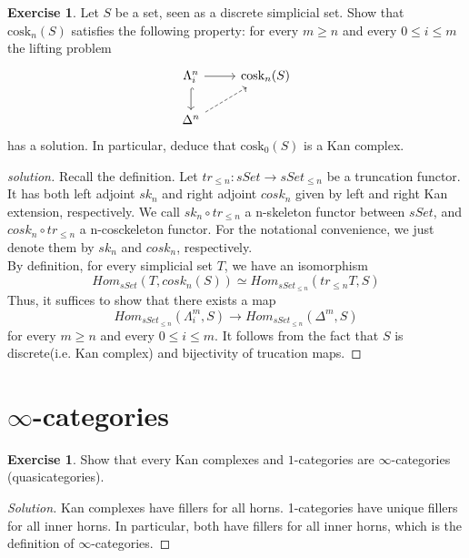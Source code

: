 \documentclass[10pt,a4paper,reqno,oneside]{book} %
\theoremstyle{plain}
\theoremstyle{definition}
\newtheorem{exercise}[thm]{Exercise}
\theoremstyle{remark}
\numberwithin{equation}{section}
\begin{document}
\begin{exercise} \label{ex:coskeleton_Kan_complex}
	Let $S$ be a set, seen as a discrete simplicial set.
	Show that $\mathrm{cosk}_n(S)$ satisfies the following property: for every $m \ge n$ and every $0 \le i \le m$ the lifting problem
	\[ \begin{tikzcd}
		\Lambda^n_i \arrow{r} \arrow[hook]{d} & \mathrm{cosk}_n(S) \\
		\Delta^n \arrow[dashed]{ur}
	\end{tikzcd} \]
	has a solution.
	In particular, deduce that $\mathrm{cosk}_0(S)$ is a Kan complex.
\end{exercise}

\ifpersonal
\begin{proof}[solution]
    Recall the definition. Let $tr_{\leq n}:sSet \to sSet_{\leq n}$ be a truncation functor. It has both left adjoint $sk_n$ and right adjoint $cosk_n$ given by left and right Kan extension, respectively. We call $sk_n \circ tr_{\leq n}$ a n-skeleton functor between $sSet$, and $cosk_n \circ tr_{\leq n}$ a n-cosckeleton functor. For the notational convenience, we just denote them by $sk_n$ and $cosk_n$, respectively. \\
    By definition, for every simplicial set $T$, we have an isomorphism 
    \[Hom_{sSet}(T, cosk_n(S)) \simeq Hom_{sSet_{\leq n}}(tr_{\leq n}T, S)\]
    Thus, it suffices to show that there exists a map 
    \[Hom_{sSet_{\leq n}}(\Lambda^m_i, S) \to Hom_{sSet_{\leq n}}(\Delta^m, S)\]
    for every $m \geq n$ and every $0 \leq i \leq m$. It follows from the fact that $S$ is discrete(i.e. Kan complex) and bijectivity of trucation maps. 
\end{proof}
\fi

\section{$\infty$-categories}

\begin{exercise}
	Show that every Kan complexes and $1$-categories are $\infty$-categories (quasicategories).
\end{exercise}

\ifpersonal
\begin{proof}[Solution]
Kan complexes have fillers for all horns. 1-categories have unique fillers for all inner horns. In particular, both have
fillers for all inner horns, which is the definition of $\infty$-categories.
\end{proof}
\fi
\end{document}

